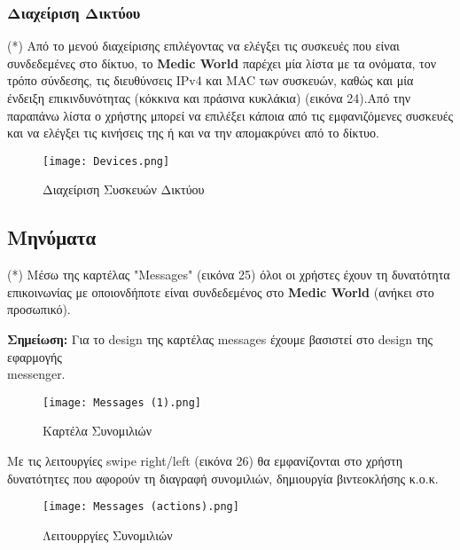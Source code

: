 \documentclass{article}
\begin{document}
\subsubsection{Διαχείριση Δικτύου}

(*) Από το μενού διαχείρισης επιλέγοντας να ελέγξει τις συσκευές που είναι συνδεδεμένες στο δίκτυο, το \textbf{Medic World} παρέχει μία λίστα με τα ονόματα, τον τρόπο σύνδεσης, τις διευθύνσεις IPv4 και MAC των συσκευών, καθώς και μία ένδειξη επικινδυνότητας (κόκκινα και πράσινα κυκλάκια) (εικόνα 24).Από την παραπάνω λίστα ο χρήστης μπορεί  να επιλέξει κάποια από τις εμφανιζόμενες συσκευές και να ελέγξει τις κινήσεις της ή και να την απομακρύνει από το δίκτυο.


\begin{figure}[!htb]
\centering
\texttt{[image: Devices.png]} 
\caption{\label{fig: devices} Διαχείριση Συσκευών Δικτύου}
\end{figure}

\subsection{Μηνύματα}

(*) Μέσω της καρτέλας "Messages" (εικόνα 25) όλοι οι χρήστες έχουν τη δυνατότητα επικοινωνίας με οποιονδήποτε είναι συνδεδεμένος στο \textbf{Medic World} (ανήκει στο προσωπικό). 

\vspace{0.3cm}

\textbf{Σημείωση:} Για το design της καρτέλας messages έχουμε βασιστεί στο design της εφαρμογής \\ messenger.

\vspace{0.3cm}

\begin{figure}[!htb]
\centering
\texttt{[image: Messages (1).png]} 
\caption{\label{fig: messenger} Καρτέλα Συνομιλιών}
\end{figure}

\newpage

\par Με τις λειτουργίες swipe right/left (εικόνα 26) θα εμφανίζονται στο χρήστη δυνατότητες  που αφορούν τη διαγραφή συνομιλιών, δημιουργία βιντεοκλήσης κ.ο.κ. 

\vspace{0.3cm}

\begin{figure}[!htb]
\centering
\texttt{[image: Messages (actions).png]} 
\caption{\label{fig: swipe left/right} Λειτουρργίες Συνομιλιών}
\end{figure}
\end{document}
